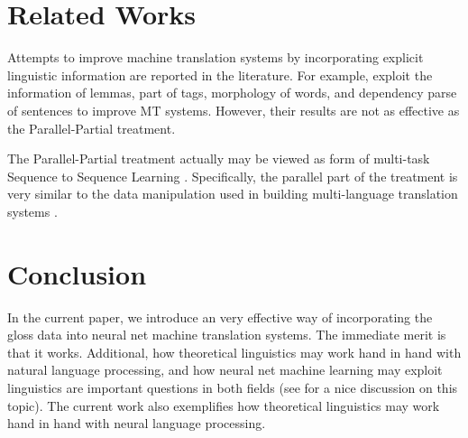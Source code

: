 \documentclass[11pt,a4paper]{article}
\begin{document}
\section{Related Works}\label{relate_works}
Attempts to improve machine translation systems by incorporating explicit linguistic information are reported in the literature. For example, \citet{sennrich2016linguistic} exploit the information of lemmas, part of tags, morphology of words, and dependency parse of sentences to improve MT systems. However, their results are not as effective as the Parallel-Partial treatment. 

The Parallel-Partial treatment actually may be viewed as form of multi-task Sequence to Sequence Learning \citep{luong2015multi}. Specifically, the parallel part of the treatment is very similar to the data manipulation used in building multi-language translation systems \citep{google_zero_shot}.  
\section{Conclusion}
In the current paper, we introduce an very effective way of incorporating the gloss data into neural net machine translation systems. The immediate merit is that it works. Additional, how theoretical linguistics may work hand in hand with natural language processing, and how neural net machine learning may exploit linguistics are important questions in both fields (see \citet{pater2017generative} for a nice discussion on this topic). The current work also exemplifies how theoretical linguistics may work hand in hand with neural language processing. 





\appendix
\end{document}
